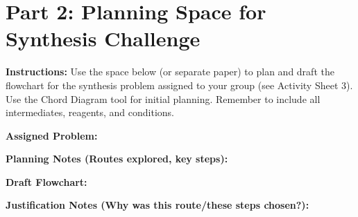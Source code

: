 \documentclass[11pt, a4paper]{article}
\begin{document}
\section*{Part 2: Planning Space for Synthesis Challenge}

\textbf{Instructions:} Use the space below (or separate paper) to plan and draft the flowchart for the synthesis problem assigned to your group (see Activity Sheet 3). Use the Chord Diagram tool for initial planning. Remember to include all intermediates, reagents, and conditions.

\textbf{Assigned Problem:} \underline{\hspace{8cm}}

\textbf{Planning Notes (Routes explored, key steps):}
\vspace{4cm}

\textbf{Draft Flowchart:}
\vspace{10cm} %

\textbf{Justification Notes (Why was this route/these steps chosen?):}
\vspace{3cm}
\end{document}
